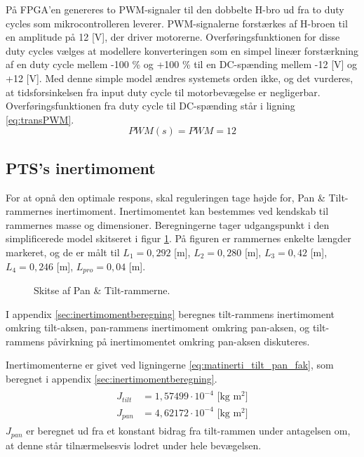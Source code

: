 På FPGA'en genereres to PWM-signaler til den dobbelte H-bro ud fra to
duty cycles som mikrocontrolleren leverer.
PWM-signalerne forstærkes af H-broen til en amplitude på 12 [V],
der driver motorerne.
Overføringsfunktionen for disse duty cycles %
vælges at modellere konverteringen som en simpel lineær forstærkning af en duty cycle mellem -100 \% og +100 \%
til en DC-spænding mellem -12 [V] og +12 [V]. Med denne simple model ændres systemets orden ikke,
og det vurderes, at tidsforsinkelsen fra input duty cycle til motorbevægelse er negligerbar.
Overføringsfunktionen fra duty cycle til DC-spænding står i ligning \ref{eq:transPWM}.
\begin{equation}
	PWM\left(s\right)=PWM=12
	\label{eq:transPWM}
\end{equation}

\subsection{PTS's inertimoment}
\label{sec:inertimoment}
For at opnå den optimale respons, skal reguleringen tage højde for, %
Pan \& Tilt-rammernes inertimoment. Inertimomentet kan bestemmes ved kendskab til rammernes
masse og dimensioner. Beregningerne tager udgangspunkt i den simplificerede model skitseret i figur \ref{fig:inerti_PTS}.
På figuren er rammernes enkelte længder markeret, og de er målt til \({L_{1}} =0,292\) [m],
\({L_{2}} =0,280\) [m], \({L_{3}}= 0,42\) [m], \({L_{4}} =0,246\) [m], \({L_{pro}}=0,04\) [m].
\begin{figure}[!th]
\centering
\begin{tikzpicture}[scale=0.8]

\end{tikzpicture}
\caption[Skitse af Pan \& Tilt-rammerne]{Skitse af Pan \& Tilt-rammerne.}
\label{fig:inerti_PTS}
\end{figure}

I appendix \ref{sec:inertimomentberegning} beregnes tilt-rammens inertimoment omkring tilt-aksen,
pan-rammens inertimoment omkring pan-aksen,
og tilt-rammens påvirkning på inertimomentet omkring pan-aksen diskuteres.

Inertimomenterne er givet ved ligningerne \ref{eq:matinerti_tilt_pan_fak},
som beregnet i appendix \ref{sec:inertimomentberegning}.
\begin{align}
\label{eq:matinerti_tilt_pan_fak}
\begin{split}
{J_{tilt}}&=1,57499\cdot{10}^{-4} \text{ [kg m$^2$]}
\\
{J_{pan}}&=4,62172\cdot{10}^{-4} \text{ [kg m$^2$]}
\end{split}
\end{align}
\(J_{pan}\) er beregnet ud fra et konstant bidrag fra tilt-rammen under antagelsen om,
at denne står tilnærmelsesvis lodret under hele bevægelsen.


